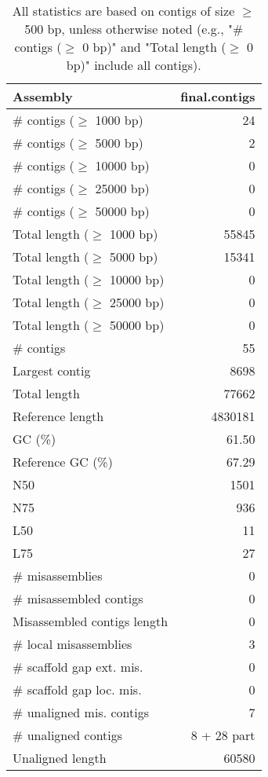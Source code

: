 \documentclass[12pt,a4paper]{article}
\begin{document}
\begin{table}[ht]
\begin{center}
\caption{All statistics are based on contigs of size $\geq$ 500 bp, unless otherwise noted (e.g., "\# contigs ($\geq$ 0 bp)" and "Total length ($\geq$ 0 bp)" include all contigs).}
\begin{tabular}{|l*{1}{|r}|}
\hline
Assembly & final.contigs \\ \hline
\# contigs ($\geq$ 1000 bp) & 24 \\ \hline
\# contigs ($\geq$ 5000 bp) & 2 \\ \hline
\# contigs ($\geq$ 10000 bp) & 0 \\ \hline
\# contigs ($\geq$ 25000 bp) & 0 \\ \hline
\# contigs ($\geq$ 50000 bp) & 0 \\ \hline
Total length ($\geq$ 1000 bp) & 55845 \\ \hline
Total length ($\geq$ 5000 bp) & 15341 \\ \hline
Total length ($\geq$ 10000 bp) & 0 \\ \hline
Total length ($\geq$ 25000 bp) & 0 \\ \hline
Total length ($\geq$ 50000 bp) & 0 \\ \hline
\# contigs & 55 \\ \hline
Largest contig & 8698 \\ \hline
Total length & 77662 \\ \hline
Reference length & 4830181 \\ \hline
GC (\%) & 61.50 \\ \hline
Reference GC (\%) & 67.29 \\ \hline
N50 & 1501 \\ \hline
N75 & 936 \\ \hline
L50 & 11 \\ \hline
L75 & 27 \\ \hline
\# misassemblies & 0 \\ \hline
\# misassembled contigs & 0 \\ \hline
Misassembled contigs length & 0 \\ \hline
\# local misassemblies & 3 \\ \hline
\# scaffold gap ext. mis. & 0 \\ \hline
\# scaffold gap loc. mis. & 0 \\ \hline
\# unaligned mis. contigs & 7 \\ \hline
\# unaligned contigs & 8 + 28 part \\ \hline
Unaligned length & 60580 \\ \hline

\end{tabular}
\end{center}
\end{table}
\end{document}
